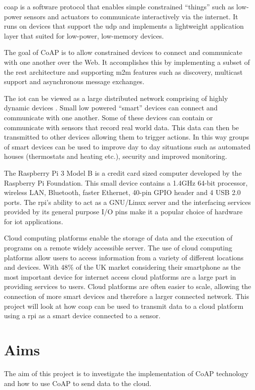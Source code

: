 \documentclass{article}
\begin{document}
	\gls{coap} is a software protocol that enables simple constrained ``things'' such as low-power sensors and actuators to communicate interactively via the internet. 
	It runs on devices that support the \gls{udp} and implements a lightweight application layer that suited for low-power, low-memory devices. 
	
	The goal of CoAP is to allow constrained devices to connect and communicate with one another over the Web. It accomplishes this by implementing a subset of the \gls{rest} architecture and supporting \gls{m2m} features such as discovery, multicast support and asynchronous message exchanges.

	The \gls{iot} can be viewed as a large distributed network comprising of highly dynamic devices \citep{miorandi2012internet}. Small low powered ``smart'' devices can connect and communicate with one another. Some of these devices can contain or communicate with sensors that record real world data. This data can then be transmitted to other devices allowing them to trigger actions. In this way groups of smart devices can be used to improve day to day situations such as automated houses (thermostats and heating etc.), security and improved monitoring.

	The Raspberry Pi 3 Model B \citep{pi3model} is a credit card sized computer developed by the Raspberry Pi Foundation. This small device contains a 1.4GHz 64-bit processor, wireless LAN, Bluetooth, faster Ethernet, 40-pin GPIO header and 4 USB 2.0 ports. The \gls{rpi}'s ability to act as a GNU/Linux server and the interfacing services provided by its general purpose I/O pins make it a popular choice of hardware for \gls{iot} applications. \citep{kumar2016iot}

	Cloud computing platforms enable the storage of data and the execution of programs on a remote widely accessible server. The use of cloud computing platforms allow users to access information from a variety of different locations and  devices. With 48\% of the UK market considering their smartphone as the most important device for internet access \citep{ofcom2018} cloud platforms are a large part in providing services to users. Cloud platforms are often easier to scale, allowing the connection of more smart devices and therefore a larger connected network. This project will look at how \gls{coap} can be used to transmit data to a cloud platform using a \gls{rpi} as a smart device connected to a sensor.


	\section{Aims}
	The aim of this project is to investigate the implementation of CoAP technology and how to use CoAP to send data to the cloud.
\end{document}
